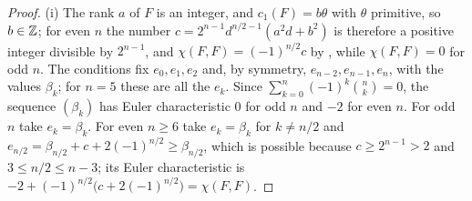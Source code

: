 \begin{proof}
(i) The rank $a$ of $F$ is an integer, and $c_{1}(F)=b\theta$ with $\theta$
primitive, so $b\in\mathbb{Z}$; for even $n$ the number
$c=2^{n-1}d^{n/2-1}(a^{2}d+b^{2})$ is therefore a positive integer divisible
by $2^{n-1}$, and $\chi(F,F)=(-1)^{n/2}c$ by , while
$\chi(F,F)=0$ for odd $n$. The conditions fix $e_{0},e_{1},e_{2}$ and, by
symmetry, $e_{n-2},e_{n-1},e_{n}$, with the values $\beta_{k}$; for $n=5$ these
are all the $e_{k}$. Since $\sum_{k=0}^{n}(-1)^{k}\binom{n}{k}=0$, the
sequence $(\beta_{k})$ has Euler characteristic $0$ for odd $n$ and $-2$ for
even $n$. For odd $n$ take $e_{k}=\beta_{k}$. For even $n\ge6$ take
$e_{k}=\beta_{k}$ for $k\ne n/2$ and
$e_{n/2}=\beta_{n/2}+c+2(-1)^{n/2}\ge\beta_{n/2}$, which is possible because
$c\ge2^{n-1}>2$ and $3\le n/2\le n-3$; its Euler characteristic is
$-2+(-1)^{n/2}\bigl(c+2(-1)^{n/2}\bigr)=\chi(F,F)$.


\end{proof}
